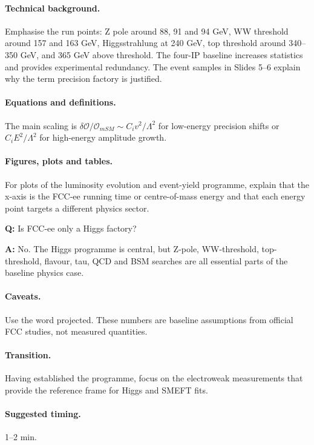 \documentclass[11pt,a4paper]{report}
\begin{document}
\paragraph{Technical background.}
Emphasise the run points: Z pole around 88, 91 and 94 GeV, WW threshold around 157 and 163 GeV, Higgsstrahlung at 240 GeV, top threshold around 340--350 GeV, and 365 GeV above threshold.  The four-IP baseline increases statistics and provides experimental redundancy.  The event samples in Slides 5--6 explain why the term precision factory is justified.

\paragraph{Equations and definitions.}
The main scaling is $\delta\mathcal O/\mathcal O_{
m SM}\sim C_i v^2/\Lambda^2$ for low-energy precision shifts or $C_iE^2/\Lambda^2$ for high-energy amplitude growth.

\paragraph{Figures, plots and tables.}
For plots of the luminosity evolution and event-yield programme, explain that the x-axis is the FCC-ee running time or centre-of-mass energy and that each energy point targets a different physics sector.

\begin{questionbox}
\textbf{Q:} Is FCC-ee only a Higgs factory?\par
\textbf{A:} No.  The Higgs programme is central, but Z-pole, WW-threshold, top-threshold, flavour, tau, QCD and BSM searches are all essential parts of the baseline physics case.
\end{questionbox}

\paragraph{Caveats.}
Use the word projected.  These numbers are baseline assumptions from official FCC studies, not measured quantities.

\paragraph{Transition.}
Having established the programme, focus on the electroweak measurements that provide the reference frame for Higgs and SMEFT fits.

\paragraph{Suggested timing.}
1--2 min.
\end{document}
